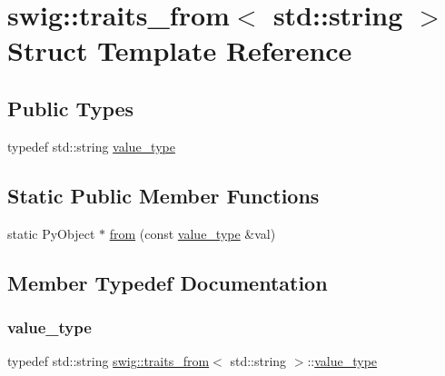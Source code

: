 \hypertarget{structswig_1_1traits__from_3_01std_1_1string_01_4}{}\section{swig\+:\+:traits\+\_\+from$<$ std\+:\+:string $>$ Struct Template Reference}
\label{structswig_1_1traits__from_3_01std_1_1string_01_4}
\subsection*{Public Types}
\begin{DoxyCompactItemize}
\item 
typedef std\+::string \hyperlink{structswig_1_1traits__from_3_01std_1_1string_01_4_a873f8111e50ab64c5f0711f3fc8479ad}{value\+\_\+type}
\end{DoxyCompactItemize}
\subsection*{Static Public Member Functions}
\begin{DoxyCompactItemize}
\item 
static Py\+Object $\ast$ \hyperlink{structswig_1_1traits__from_3_01std_1_1string_01_4_af6e0987239b6f657facf1fc5fcbddea6}{from} (const \hyperlink{structswig_1_1traits__from_3_01std_1_1string_01_4_a873f8111e50ab64c5f0711f3fc8479ad}{value\+\_\+type} \&val)
\end{DoxyCompactItemize}


\subsection{Member Typedef Documentation}
\mbox{\label{structswig_1_1traits__from_3_01std_1_1string_01_4_a873f8111e50ab64c5f0711f3fc8479ad}} 
\subsubsection{\texorpdfstring{value\+\_\+type}{value\_type}}
{\footnotesize\ttfamily typedef std\+::string \hyperlink{structswig_1_1traits__from}{swig\+::traits\+\_\+from}$<$ std\+::string $>$\+::\hyperlink{structswig_1_1traits__from_3_01std_1_1string_01_4_a873f8111e50ab64c5f0711f3fc8479ad}{value\+\_\+type}}



